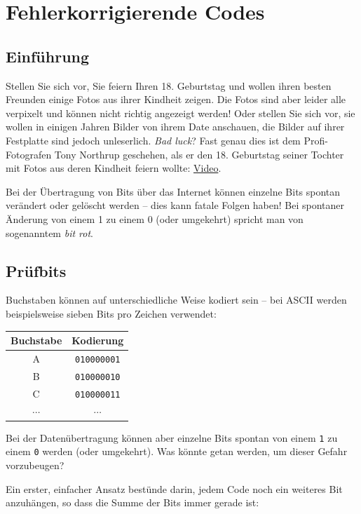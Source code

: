 \chapter{Fehlerkorrigierende Codes}

\section{Einführung}

Stellen Sie sich vor, Sie feiern Ihren 18. Geburtstag und wollen ihren besten Freunden einige Fotos aus ihrer Kindheit zeigen. Die Fotos sind aber leider alle verpixelt und können nicht richtig angezeigt werden! Oder stellen Sie sich vor, sie wollen in einigen Jahren Bilder von ihrem Date anschauen, die Bilder auf ihrer Festplatte sind jedoch unleserlich. \textit{Bad luck}? Fast genau dies ist dem Profi-Fotografen Tony Northrup geschehen, als er den 18. Geburtstag seiner Tochter mit Fotos aus deren Kindheit feiern wollte: \href{https://www.youtube.com/watch?v=xvbnhCDfREk}{Video}.

Bei der Übertragung von Bits über das Internet können einzelne Bits spontan verändert oder gelöscht werden -- dies kann fatale Folgen haben! Bei spontaner Änderung von einem 1 zu einem 0 (oder umgekehrt) spricht man von sogenanntem \textit{bit rot}.

\section{Prüfbits}

Buchstaben können auf unterschiedliche Weise kodiert sein -- bei ASCII werden beispielsweise sieben Bits pro Zeichen verwendet:

\begin{table}[H]
\centering
\begin{tabular}{c|c}
Buchstabe & Kodierung \\\midrule\midrule
A & \texttt{010000001} \\\midrule
B & \texttt{010000010}\\\midrule
C & \texttt{010000011}\\\midrule
$\cdots$ & $\cdots$
\end{tabular}
\end{table}
Bei der Datenübertragung können aber einzelne Bits spontan von einem \texttt{1} zu einem \texttt{0} werden (oder umgekehrt). Was könnte getan werden, um dieser Gefahr vorzubeugen?

Ein erster, einfacher Ansatz bestünde darin, jedem Code noch ein weiteres Bit anzuhängen, so dass die Summe der Bits immer gerade ist:

